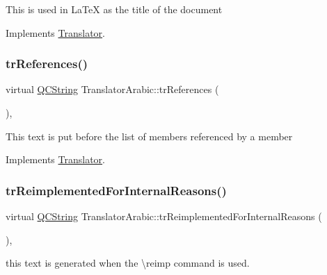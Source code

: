 This is used in La\+TeX as the title of the document 

Implements \mbox{\hyperlink{class_translator}{Translator}}.

\mbox{\label{class_translator_arabic_a71262664c2f41bd6ea6ce7d38e017fb4}} 
\subsubsection{\texorpdfstring{trReferences()}{trReferences()}}
{\footnotesize\ttfamily virtual \mbox{\hyperlink{class_q_c_string}{Q\+C\+String}} Translator\+Arabic\+::tr\+References (\begin{DoxyParamCaption}{ }\end{DoxyParamCaption})\hspace{0.3cm}{\ttfamily [inline]}, {\ttfamily [virtual]}}

This text is put before the list of members referenced by a member 

Implements \mbox{\hyperlink{class_translator}{Translator}}.

\mbox{\label{class_translator_arabic_a059a6f4e8d6d6be88c0091250b5eba77}} 
\subsubsection{\texorpdfstring{trReimplementedForInternalReasons()}{trReimplementedForInternalReasons()}}
{\footnotesize\ttfamily virtual \mbox{\hyperlink{class_q_c_string}{Q\+C\+String}} Translator\+Arabic\+::tr\+Reimplemented\+For\+Internal\+Reasons (\begin{DoxyParamCaption}{ }\end{DoxyParamCaption})\hspace{0.3cm}{\ttfamily [inline]}, {\ttfamily [virtual]}}

this text is generated when the \textbackslash{}reimp command is used. \mbox{\label{class_translator_arabic_af3bc590702619fc2294ce4ca0f27721a}} 
